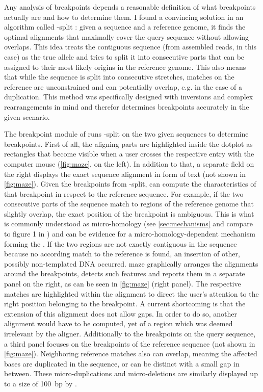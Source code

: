 Any analysis of \sv breakpoints depends a reasonable definition of what
breakpoints actually are and how to determine them. I found a convincing
solution in an algorithm called \last-split \citep{Frith2015}: given a sequence
and a reference genome, it finds the optimal alignments that maximally cover the
query sequence without allowing overlaps.  This idea treats the contiguous
sequence (from assembled reads, in this case) as the true allele and tries to
split it into consecutive parts that can be assigned to their most likely
origins in the reference genome. This also means that while the sequence is
split into consecutive stretches, matches on the reference are unconstrained and
can potentially overlap, e.g. in the case of a duplication. This method was
specifically designed with inversions and complex rearrangements in mind
and therefor determines breakpoints accurately in the given scenario.

The breakpoint module of \maze runs \last-split on the two given sequences to
determine breakpoints. First of all, the aligning parts are highlighted inside
the dotplot as rectangles that become visible when a user crosses the respective
entry with the computer mouse (\cref{fig:maze}, on the left). In addition to
that, a separate field on the right displays the exact sequence alignment in
form of text (not shown in \cref{fig:maze}). Given the breakpoints from
\last-split, \maze can compute the characteristics of that breakpoint in respect
to the reference sequence. For example, if the two consecutive parts of the
sequence match to regions of the reference genome that slightly overlap, the
exact position of the breakpoint is ambiguous. This is what is commonly
understood as micro-homology (see \cref{sec:mechanisms} and compare to
figure 1 in \citet{Hastings2009}) and can be evidence for a
micro-homology-dependent mechanism forming the \sv. If the two regions are not
exactly contiguous in the sequence because no according match to the reference
is found, an insertion of other, possibly non-templated DNA occurred. \Ac{maze}
graphically arranges the alignments around the breakpoints, detects such
features and reports them in a separate panel on the right, as can be seen in
\cref{fig:maze} (right panel). The respective matches are highlighted within the
alignment to direct the user’s attention to the right position belonging to the
breakpoint. A current shortcoming is that the extension of this alignment does
not allow gaps. In order to do so, another alignment would have to be computed,
yet of a region which was deemed irrelevant by the \last aligner. Additionally
to the breakpoints on the query sequence, a third panel focuses on the
breakpoints of the reference sequence (not shown in \cref{fig:maze}).
Neighboring reference matches also can overlap, meaning the affected bases are
duplicated in the sequence, or can be distinct with a small gap in between.
These micro-duplications and micro-deletions are similarly displayed up to a
size of 100~bp by \maze.

